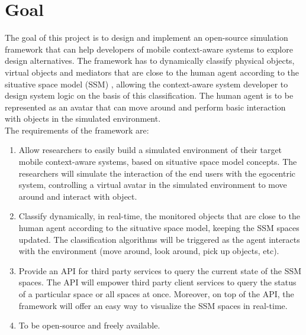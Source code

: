\section{Goal} %
\label{sec:goal}
The goal of this project is to design and implement an open-source simulation framework that can help developers of mobile context-aware systems to explore design alternatives. The framework has to dynamically classify physical objects, virtual objects and mediators that are close to the human agent according to the situative space model (SSM) \cite{pederson2011situative}, allowing the context-aware system developer to design system logic on the basis of this classification. The human agent is to be represented as an avatar that can move around and perform basic interaction with objects in the simulated environment.\\

The requirements of the framework are:
\begin{enumerate}
	
	\item Allow researchers to easily build a simulated environment of their target mobile context-aware systems, based on situative space model concepts. The researchers will simulate the interaction of the end users with the egocentric system, controlling a virtual avatar in the simulated environment to move around and interact with object.

	\item Classify dynamically, in real-time, the monitored objects that are close to the human agent according to the situative space model, keeping the SSM spaces updated. The classification algorithms will be triggered as the agent interacts with the environment (move around, look around, pick up objects, etc).

	\item Provide an API for third party services to query the current state of the SSM spaces. The API will empower third party client services to query the status of a particular space or all spaces at once. Moreover, on top of the API, the framework will offer an easy way to visualize the SSM spaces in real-time.

	\item To be open-source and freely available.
\end{enumerate}


